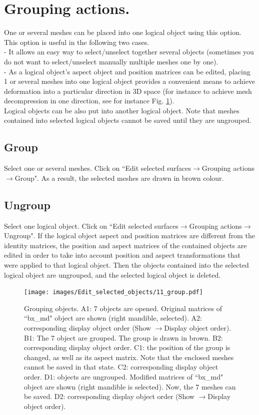 \section{Grouping actions.}
One or several meshes can be placed into one logical object using this option. This option is useful in the following two cases.\\
- It allows an easy way to select/unselect together several objects (sometimes you do not want
to select/unselect manually multiple meshes one by one).\\
- As a logical object's aspect object and position matrices can be edited, placing 1 or several
meshes into one logical object provides a convenient means to achieve deformation into
a particular direction in 3D space (for instance to achieve mesh decompression in one
direction, see for instance Fig. \ref{grouping}).\\
Logical objects can be also put into another logical object. Note that meshes contained into selected logical objects cannot be saved until they are ungrouped.

\subsection{Group}
Select one or several meshes. Click on ``Edit selected surfaces$\rightarrow$Grouping actions$\rightarrow$Group". As a result, the selected meshes are drawn in brown colour.
\subsection{Ungroup}
Select one logical object. Click on ``Edit selected surfaces$\rightarrow$Grouping actions$\rightarrow$Ungroup". If the logical object aspect and position matrices are different from the identity matrices, the position and aspect matrices of the contained objects are edited in order to take into account position and aspect transformations that were applied to that logical object. Then the objects contained into the selected logical object are ungrouped, and the selected logical object is deleted.\\


\begin{figure}
  \centering
  \texttt{[image: images/Edit\_selected\_objects/11\_group.pdf]} 
	\caption{
Grouping objects. A1: 7 objects are opened. Original matrices of ``bx\_md" object are shown (right mandible, selected). A2: corresponding display object order (Show $\rightarrow$Display object order). B1: The 7 object are grouped. The group is drawn in brown. B2: corresponding display object order. C1: the position of the group is changed, as well as its aspect matrix. Note that the enclosed meshes cannot be saved in that state. C2: corresponding display object order. D1: objects are ungrouped. Modified matrices of ``bx\_md" object are shown (right mandible is selected). Now, the 7 meshes can be saved. D2: corresponding display object order (Show $\rightarrow$Display object order).}
\label{grouping}
 
\end{figure}


